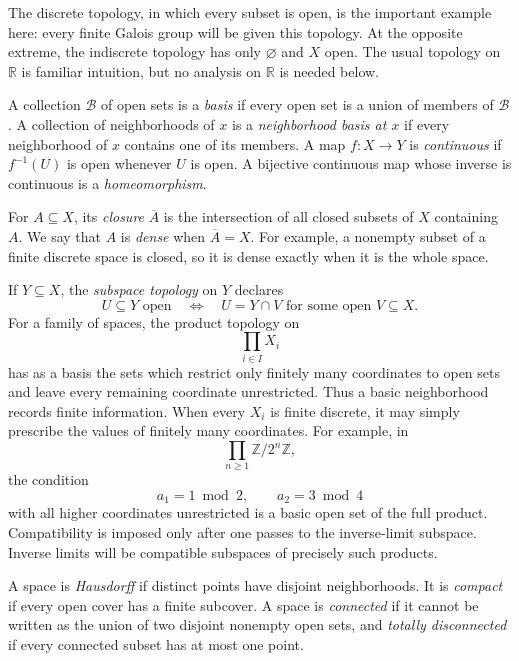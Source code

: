 The discrete topology, in which every subset is open, is the important
example here: every finite Galois group will be given this topology.  At the
opposite extreme, the indiscrete topology has only \(\varnothing\) and \(X\)
open.  The usual topology on \(\mathbb R\) is familiar intuition, but no
analysis on \(\mathbb R\) is needed below.

\begin{definition}
A collection \(\mathcal B\) of open sets is a \emph{basis} if every open set
is a union of members of \(\mathcal B\).  A collection of neighborhoods of
\(x\) is a \emph{neighborhood basis at \(x\)} if every neighborhood of \(x\)
contains one of its members.  A map \(f:X\to Y\) is \emph{continuous} if
\(f^{-1}(U)\) is open whenever \(U\) is open.  A bijective continuous map
whose inverse is continuous is a \emph{homeomorphism}.
\end{definition}

For \(A\subseteq X\), its \emph{closure} \(\overline A\) is the intersection
of all closed subsets of \(X\) containing \(A\).  We say that \(A\) is
\emph{dense} when \(\overline A=X\).  For example, a nonempty subset of a
finite discrete space is closed, so it is dense exactly when it is the whole
space.

If \(Y\subseteq X\), the \emph{subspace topology} on \(Y\) declares
\[
U\subseteq Y\text{ open}\quad\Longleftrightarrow\quad
U=Y\cap V\text{ for some open }V\subseteq X.
\]
For a family of spaces, the product topology on
\[
\prod_{i\in I}X_i
\]
has as a basis the sets which restrict only finitely many coordinates to open
sets and leave every remaining coordinate unrestricted.  Thus a basic
neighborhood records finite information.  When every \(X_i\) is finite
discrete, it may simply prescribe the values of finitely many coordinates.
For example, in
\[
\prod_{n\geq1}\mathbb Z/2^n\mathbb Z,
\]
the condition
\[
a_1=1\bmod2,
\qquad
a_2=3\bmod4
\]
with all higher coordinates unrestricted is a basic open set of the full
product.  Compatibility is imposed only after one passes to the inverse-limit
subspace.
Inverse limits will be compatible subspaces of precisely such products.

\begin{definition}
A space is \emph{Hausdorff} if distinct points have disjoint neighborhoods.
It is \emph{compact} if every open cover has a finite subcover.  A space is
\emph{connected} if it cannot be written as the union of two disjoint nonempty
open sets, and \emph{totally disconnected} if every connected subset has at
most one point.
\end{definition}


